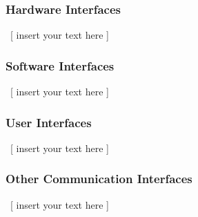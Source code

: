 \documentclass[twoside,letterpaper]{article}
\begin{document}
\subsubsection[Hardware Interfaces]{\rmfamily\bfseries\color{black} Hardware Interfaces}
\hypertarget{RefHeading20859017292}{}{\color{black}
\foreignlanguage{english}{\ [ insert your text here ]}}

\subsubsection[Software Interfaces]{\rmfamily\bfseries\color{black} Software Interfaces}
\hypertarget{RefHeading21059017292}{}{\color{black}
\foreignlanguage{english}{\ [ insert your text here ]}}

\subsubsection[User Interfaces]{\rmfamily\bfseries\color{black} User Interfaces}
\hypertarget{RefHeading21259017292}{}{\color{black}
\foreignlanguage{english}{\ [ insert your text here ]}}

\subsubsection[Other Communication Interfaces]{\rmfamily\bfseries\color{black} Other
Communication Interfaces}
\hypertarget{RefHeading21459017292}{}{\color{black}
\foreignlanguage{english}{\ [ insert your text here ]}}


\bigskip


\bigskip

\bigskip
\clearpage\setcounter{page}{1}\pagestyle{Convertiv}

\bigskip
\end{document}
